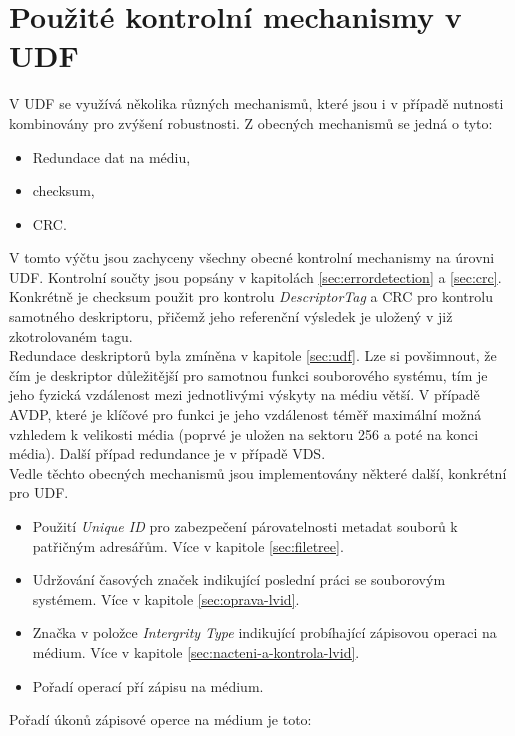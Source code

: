 \section{Použité kontrolní mechanismy v UDF}
\label{sec:howtolabelthat}
V UDF se využívá několika různých mechanismů, které jsou i v případě nutnosti kombinovány pro zvýšení robustnosti. Z obecných mechanismů se jedná o tyto:
\begin{itemize}
    \item Redundace dat na médiu,
    \item checksum,
    \item CRC.
\end{itemize}
V tomto výčtu jsou zachyceny všechny obecné kontrolní mechanismy na úrovni UDF. Kontrolní součty jsou popsány v kapitolách  \ref{sec:errordetection} a \ref{sec:crc}. Konkrétně je checksum použit pro kontrolu \textit{DescriptorTag} a CRC pro kontrolu samotného deskriptoru, přičemž jeho referenční výsledek je uložený v již zkotrolovaném tagu.\\
Redundace deskriptorů byla zmíněna v kapitole \ref{sec:udf}. Lze si povšimnout, že čím je deskriptor důležitější pro samotnou funkci souborového systému, tím je jeho fyzická vzdálenost mezi jednotlivými výskyty na médiu větší. V případě AVDP, které je klíčové pro funkci je jeho vzdálenost téměř maximální možná vzhledem k velikosti média (poprvé je uložen na sektoru 256 a poté na konci média). Další případ redundance je v případě VDS.\\
Vedle těchto obecných mechanismů jsou implementovány některé další, konkrétní pro UDF.
\begin{itemize}
    \item Použití \textit{Unique ID} pro zabezpečení párovatelnosti metadat souborů k patřičným adresářům. Více v kapitole \ref{sec:filetree}. 
    \item Udržování časových značek indikující poslední práci se souborovým systémem. Více v kapitole \ref{sec:oprava-lvid}.
    \item Značka v položce \textit{Intergrity Type} indikující probíhající zápisovou operaci na médium. Více v kapitole \ref{sec:nacteni-a-kontrola-lvid}.
    \item Pořadí operací pří zápisu na médium.
\end{itemize}
Pořadí úkonů zápisové operce na médium je toto:

